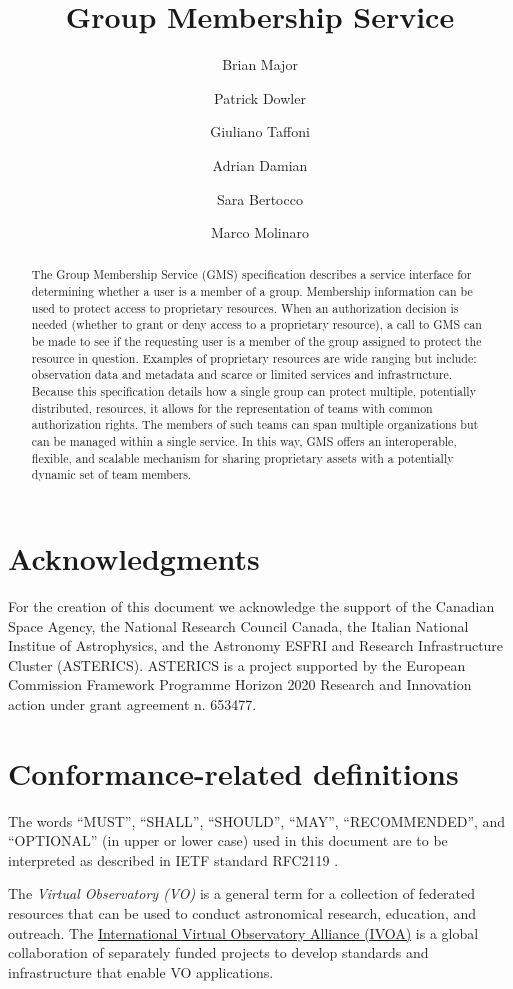 \documentclass[11pt,a4paper]{ivoa}
\title{Group Membership Service}
\author{Brian Major}
\author{Patrick Dowler}
\author{Giuliano Taffoni}
\author{Adrian Damian}
\author{Sara Bertocco}
\author{Marco Molinaro}
\begin{document}
\begin{abstract}

The Group Membership Service (GMS) specification describes a service interface for determining whether a user is a member of a group.  Membership information can be used to protect access to proprietary resources.  When an authorization decision is needed (whether to grant or deny access to a proprietary resource), a call to GMS can be made to see if the requesting user is a member of the group assigned to protect the resource in question.  Examples of proprietary resources are wide ranging but include: observation data and metadata and scarce or limited services and infrastructure.  Because this specification details how a single group can protect multiple, potentially distributed, resources, it allows for the representation of teams with common authorization rights.  The members of such teams can span multiple organizations but can be managed within a single service.  In this way, GMS offers an interoperable, flexible, and scalable mechanism for sharing proprietary assets with a potentially dynamic set of team members.

\end{abstract}

\section*{Acknowledgments}
For the creation of this document we acknowledge the support of the Canadian Space Agency, the National Research Council Canada, the Italian National Institue of Astrophysics, and the Astronomy ESFRI and Research Infrastructure Cluster (ASTERICS).  ASTERICS is a project supported by the European Commission Framework Programme Horizon 2020 Research and Innovation action under grant agreement n. 653477.

\section*{Conformance-related definitions}

The words ``MUST'', ``SHALL'', ``SHOULD'', ``MAY'', ``RECOMMENDED'', and
``OPTIONAL'' (in upper or lower case) used in this document are to be
interpreted as described in IETF standard RFC2119 \citep{std:RFC2119}.

The \emph{Virtual Observatory (VO)} is a
general term for a collection of federated resources that can be used
to conduct astronomical research, education, and outreach.
The \href{http://www.ivoa.net}{International
Virtual Observatory Alliance (IVOA)} is a global
collaboration of separately funded projects to develop standards and
infrastructure that enable VO applications.
\end{document}
